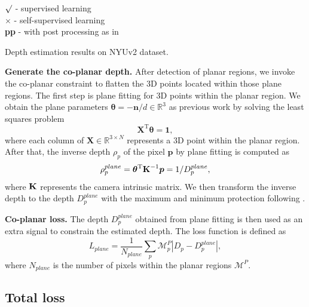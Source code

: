 \documentclass[10pt,twocolumn,letterpaper]{article}
\newcommand{\vts}{\mathrm{T}}
\newcommand{\bv}[1]{{\bm {#1}}}
\newcommand{\ba}[1]{{\bf {#1}}}
\newcommand{\beq}{\begin{equation}}
\newcommand{\eeq}{\end{equation}}
\begin{document}
\begin{table*}[ht]
\begin{varwidth}[t]{\textwidth}
{			$\surd$ - supervised learning\\
			$\times$ - self-supervised learning\\
			\textbf{pp} - with post processing as in \cite{godard2017unsupervised}\\
}
	\end{varwidth}
	\newline
	\caption{Depth estimation results on NYUv2 dataset. }
	\label{tab:nyuv2 depth}
\end{table*}



\textbf{Generate the co-planar depth.} After detection of planar regions, we invoke the co-planar constraint to flatten the 3D points located within those plane regions. The first step is plane fitting for 3D points within the planar region. We obtain the plane parameters $\bv{\theta} = -\bv{n}/d \in\mathbb{R}^{3}$ as previous work\cite{li2020textslam,yu2020p} by solving the least squares problem
\beq
\bv{X}^\vts\bv{\theta}  = \bv{1},
\eeq
where each column of $\bv{X} \in \mathbb{R}^{3 \times N}$ represents a 3D point within the planar region. 
After that, the inverse depth $\rho_{p}$ of the pixel $\bv{p}$ by plane fitting is computed as
\beq
\rho^{plane}_{p}  =  \bv{\theta}^\vts \ba{K}^{-1} \bv{p} = 1/D^{plane}_{p},
\eeq
where $\ba{K}$ represents the camera intrinsic matrix. We then transform the inverse depth to the depth $D^{plane}_{p}$ with the maximum and minimum protection following \cite{godard2017unsupervised,godard2019digging,yu2020p}.

\textbf{Co-planar loss.} The depth $D^{plane}_p$ obtained from plane fitting is then used as an extra signal to constrain the estimated depth. The loss function is defined as 
\beq
L_{plane} = \frac{1}{N_{plane}} \sum_{p} \mathcal{M}^{P}_p \left|D_{p}-D^{plane}_{p} \right|,
\eeq where $N_{plane}$ is the number of pixels within the planar regions $\mathcal{M}^{P}$. 

\subsection{Total loss}
\end{document}
